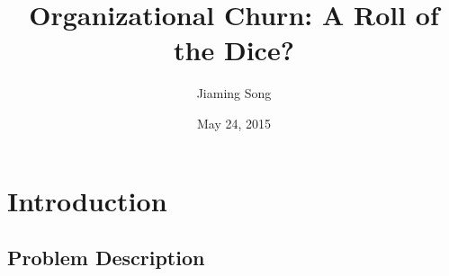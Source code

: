 \documentclass{beamer}
\title[Organizational Churn: A Roll of the Dice?]{Organizational Churn: A Roll of the Dice?} %
\author{Jiaming Song} %
\institute[Tsinghua University] %
{
Tsinghua University \\ %
\medskip
\textit{jiaming.tsong@gmail.com} %
}
\date{May 24, 2015} %
\begin{document}
\begin{frame}
\titlepage %
\end{frame}

\iffalse
\begin{frame}
\frametitle{Overview} %
\tableofcontents %
\end{frame}
\fi

\section{Introduction} %

\subsection{Problem Description} %
\end{document}
